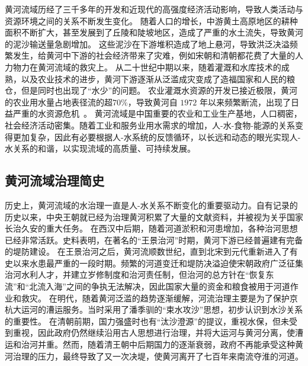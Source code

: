 黄河流域历经了三千多年的开发和近现代的高强度经济活动影响，导致人类活动与资源环境之间的关系不断发生变化\cite{fu2021}。
随着人口的增长，中游黄土高原地区的耕种面积不断扩大，甚至发展到了丘陵和陡坡地区，造成了严重的水土流失，导致黄河的泥沙输送量急剧增加\cite{wu2020a}。
这些泥沙在下游堆积造成了地上悬河，导致洪泛决溢频繁发生，给黄河中下游的社会经济带来了灾难，例如宋朝和清朝都花费了大量的人力物力在黄河流域的救灾上。
从二十世纪中期以来，随着灌溉和水库技术的成熟，以及农业技术的进步，黄河下游逐渐从泛滥成灾变成了造福国家和人民的粮仓，但是同时也出现了“水少”的问题。
农业灌溉水资源的开发已接近极限，黄河的农业用水量占地表径流的超$70\%$，导致黄河自 $1972$ 年以来频繁断流，出现了日益严重的水资源危机~\cite{wang2019f}。
黄河流域是中国重要的农业和工业生产基地，人口稠密，社会经济活动密集。随着工业和服务业用水需求的增加，人-水-食物-能源的关系变得更加复杂，因此有必要根据人-水系统的反馈循环，以长远和动态的眼光实现人-水关系的和谐，以实现流域的高质量、可持续发展。

\subsection{黄河流域治理简史}

历史上，黄河流域的水治理一直是人-水关系不断变化的重要驱动力。自有记录的历史以来，中央王朝就已经为治理黄河积累了大量的文献资料，并被视为关乎国家长治久安的重大任务。
在西汉中后期，随着河道淤积和河患增加，各种治河思想已经非常活跃。史料表明，在著名的“王景治河”时期，黄河下游已经普遍建有完备的堤防建设\cite{WangWeiJing2009}。
在王景治河之后，黄河流顺数世纪，直到北宋到元代重新进入了有史以来水患最严重的一段时期。频繁的河道变迁和堤防决溢迫使宋朝政府广泛征集治河水利人才，并建立岁修制度和治河责任制，但治河的总方针在“恢复东流”和“北流入海”之间的争执无法解决，因此国家大量的资金和粮食被用于河道作业和救灾\cite{WangWeiJing2009, yang2019}。
在明代，随着黄河泛滥的趋势逐渐缓解，河流治理主要是为了保护京杭大运河的漕运服务。当时采用了潘季驯的“束水攻沙”思想，初步认识到水沙关系的重要性\cite{WangWeiJing2009}。
在清朝前期，国力强盛时也有“汰沙澄源”的提议，重视水保，但未受到重视，因此政府仍然继续沿用古人思想进行治理，并将大运河与黄河分离，使漕运和治河并重。然而，随着清王朝中后期国力的逐渐衰弱，政府不再能承受这种黄河治理的压力，最终导致了又一次决堤，使黄河离开了七百年来南流夺淮的河道\cite{WangWeiJing2009}。


